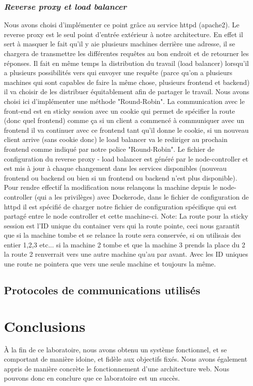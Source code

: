 \documentclass[a4paper,11pt,titlepage]{article}
\begin{document}
\subsubsection{\emph{Reverse proxy et load balancer}}
Nous avons choisi d'implémenter ce point grâce au service httpd (apache2).
Le reverse proxy est le seul point d'entrée extérieur à notre architecture. En effet il sert à masquer le fait qu'il y aie plusieurs machines derrière une adresse, il se chargera de transmettre les différentes requêtes au bon endroit et de retourner les réponses. Il fait en même temps la distribution du travail (load balancer) lorsqu'il a plusieurs possibilités vers qui envoyer une requête (parce qu'on a plusieurs machines qui sont capables de faire la même chose, plusieurs frontend et backend) il va choisir de les distribuer équitablement afin de partager le travail. Nous avons choisi ici d'implémenter une méthode "Round-Robin". La communication avec le front-end est en sticky session avec un cookie qui permet de spécifier la route (donc quel frontend) comme ça si un client a commencé à communiquer avec un frontend il va continuer avec ce frontend tant qu'il donne le cookie, si un nouveau client arrive (sans cookie donc) le load balancer va le rediriger au prochain frontend comme indiqué par notre police "Round-Robin".
Le fichier de configuration du reverse proxy - load balancer est généré par le node-controller et est mis à jour à chaque changement dans les services disponibles (nouveau frontend ou backend ou bien si un frontend ou backend n'est plus disponible). Pour rendre effectif la modification nous relançons la machine depuis le node-controller (qui a les privilèges) avec Dockerode, dans le fichier de configuration de httpd il est spécifié de charger notre fichier de configuration spécifique qui est partagé entre le node controller et cette machine-ci.
Note: La route pour la sticky session est l'ID unique du container vers qui la route pointe, ceci nous garantit que si la machine tombe et se relance la route sera conservée, si on utilisais des entier 1,2,3 etc... si la machine 2 tombe et que la machine 3 prends la place du 2 la route 2 renverrait vers une autre machine qu'au par avant. Avec les ID uniques une route ne pointera que vers une seule machine et toujours la même.

\subsection{Protocoles de communications utilisés}

\section{Conclusions}
À la fin de ce laboratoire, nous avons obtenu un système fonctionnel, et se comportant de manière idoine, et fidèle aux
objectifs fixés. Nous avons également appris de manière concrète le fonctionnement d'une architecture web. Nous pouvons
donc en conclure que ce laboratoire est un succès.
\end{document}
